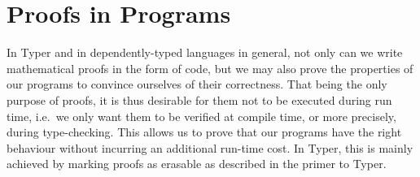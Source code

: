 \documentclass[12pt,twoside,maitrise]{dms}
\theoremstyle{definition}
\numberwithin{equation}{section}
\numberwithin{table}{chapter}
\numberwithin{figure}{chapter}
\newcommand\fn[1] {\texttt{#1}}
\def\Coq{\textsc{Coq}\xspace}
\def\Agda{\textsc{Agda}\xspace}
\def\Lean{\textsc{Lean}\xspace}
\begin{document}
% 
% 


\section{Proofs in Programs}


In Typer and in dependently-typed languages in general, not only can we write
mathematical proofs in the form of code, but we may also prove the properties
of our programs to convince ourselves of their correctness. That being the only
purpose of proofs, it is thus desirable for them not to be executed during run
time, i.e.\ we only want them to be verified at compile time, or more
precisely, during type-checking. This allows us to prove that our programs have
the right behaviour without incurring an additional run-time cost. In Typer,
this is mainly achieved by marking proofs as erasable as described in the
primer to Typer.
\end{document}

